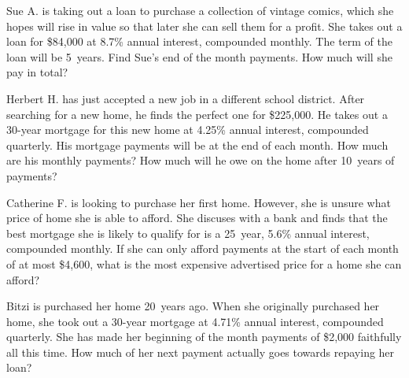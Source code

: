 \documentclass[11pt,letterpaper]{article}
\begin{document}

 Sue A. is taking out a loan to purchase a collection of vintage comics, which she hopes will rise in value so that later she can sell them for a profit. She takes out a loan for \$84,000 at 8.7\% annual interest, compounded monthly. The term of the loan will be 5~years. Find Sue's end of the month payments. How much will she pay in total?



\newpage



 Herbert H. has just accepted a new job in a different school district. After searching for a new home, he finds the perfect one for \$225,000. He takes out a 30-year mortgage for this new home at 4.25\% annual interest, compounded quarterly. His mortgage payments will be at the end of each month. How much are his monthly payments? How much will he owe on the home after 10~years of payments?



\newpage



 Catherine F. is looking to purchase her first home. However, she is unsure what price of home she is able to afford. She discuses with a bank and finds that the best mortgage she is likely to qualify for is a 25~year, 5.6\% annual interest, compounded monthly. If she can only afford payments at the start of each month of at most \$4,600, what is the most expensive advertised price for a home she can afford?



\newpage 



 Bitzi is purchased her home 20~years ago. When she originally purchased her home, she took out a 30-year mortgage at 4.71\% annual interest, compounded quarterly. She has made her beginning of the month payments of \$2,000 faithfully all this time. How much of her next payment actually goes towards repaying her loan? 
\end{document}

